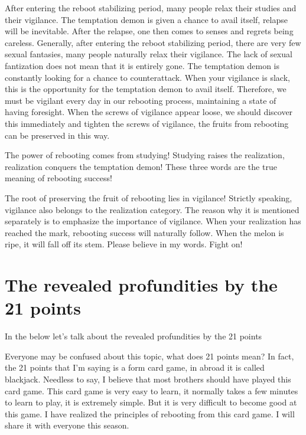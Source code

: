 \documentclass[
]{book}
\begin{document}
After entering the reboot stabilizing period, many people relax their studies and their vigilance. The temptation demon is given a chance to avail itself, relapse will be inevitable. After the relapse, one then comes to senses and regrets being careless. Generally, after entering the reboot stabilizing period, there are very few sexual fantasies, many people naturally relax their vigilance. The lack of sexual fantization does not mean that it is entirely gone. The temptation demon is constantly looking for a chance to counterattack. When your vigilance is slack, this is the opportunity for the temptation demon to avail itself. Therefore, we must be vigilant every day in our rebooting process, maintaining a state of having foresight. When the screws of vigilance appear loose, we should discover this immediately and tighten the screws of vigilance, the fruits from rebooting can be preserved in this way.

The power of rebooting comes from studying! Studying raises the realization, realization conquers the temptation demon! These three words are the true meaning of rebooting success!

The root of preserving the fruit of rebooting lies in vigilance! Strictly speaking, vigilance also belongs to the realization category. The reason why it is mentioned separately is to emphasize the importance of vigilance. When your realization has reached the mark, rebooting success will naturally follow. When the melon is ripe, it will fall off its stem. Please believe in my words. Fight on!

\hypertarget{the-revealed-profundities-by-the-21-points}{%
\section{The revealed profundities by the 21 points}\label{the-revealed-profundities-by-the-21-points}}

In the below let's talk about the revealed profundities by the 21 points

Everyone may be confused about this topic, what does 21 points mean? In fact, the 21 points that I'm saying is a form card game, in abroad it is called blackjack. Needless to say, I believe that most brothers should have played this card game. This card game is very easy to learn, it normally takes a few minutes to learn to play, it is extremely simple. But it is very difficult to become good at this game. I have realized the principles of rebooting from this card game. I will share it with everyone this season.
\end{document}

